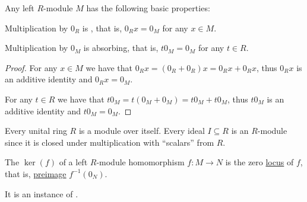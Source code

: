 \begin{proposition}\label{thm:left_module_properties}
  Any left \( R \)-module \( M \) has the following basic properties:
  \begin{propenum}
     Multiplication by \( 0_R \) is , that is, \( 0_R x = 0_M \) for any \( x \in M \).

     Multiplication by \( 0_M \) is absorbing, that is, \( t 0_M = 0_M \) for any \( t \in R \).
  \end{propenum}
\end{proposition}
\begin{proof}
   For any \( x \in M \) we have that \( 0_R x = (0_R + 0_R)x = 0_R x + 0_R x \), thus \( 0_R x \) is an additive identity and \( 0_R x = 0_M \).

   For any \( t \in R \) we have that \( t 0_M = t (0_M + 0_M) = t 0_M + t 0_M \), thus \( t 0_M \) is an additive identity and \( t 0_M = 0_M \).
\end{proof}

\begin{example}\label{ex:module/ideal_of_ring}
  Every unital ring \( R \) is a module over itself. Every ideal \( I \subseteq R \) is an \( R \)-module since it is closed under multiplication with \enquote{scalars} from \( R \).
\end{example}

\begin{definition}\label{def:left_module_kernel}
  The  \( \ker(f) \) of a left \( R \)-module homomorphism \( f: M \to N \) is the zero \hyperref[def:zero_locus]{locus} of \( f \), that is, \hyperref[def:function/preimage]{preimage} \( f^{-1}(0_N) \).

  It is an instance of .
\end{definition}

